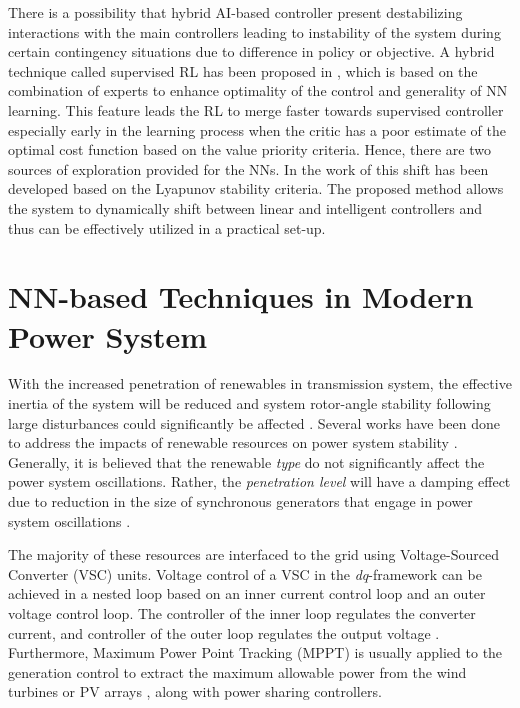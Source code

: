 \documentclass[journal]{IEEEtran}
\begin{document}
There is a possibility that hybrid AI-based controller present destabilizing interactions with the main controllers leading to instability of the system during certain contingency situations due to difference in policy or objective. A hybrid technique called supervised RL has been proposed in \cite{Rosenstein}, which is based on the combination of experts to enhance optimality of the control and generality of NN learning. This feature leads the RL to merge faster towards supervised controller especially early in the learning process when the critic has a poor estimate of the optimal cost function based on the value priority criteria. Hence, there are two sources of exploration provided for the NNs. In the work of \cite{7285605} this shift has been developed based on the Lyapunov stability criteria. The proposed method allows the system to dynamically shift between linear and intelligent controllers and thus can be effectively utilized in a practical set-up. 


\section{NN-based Techniques in Modern Power System}
With the increased penetration of renewables in transmission system, the effective inertia of the system will be reduced and system rotor-angle stability following large disturbances could significantly be affected \cite{4912364}. Several works have been done to address the impacts of renewable resources on power system stability \cite{4912364, 6331592,1525126, 1600554,ETEPETEP598, shah2010impact, shah2013oscillatory, slootweg2003impact,vittal2012rotor, sun2005transient}. Generally, it is believed that the renewable \textit{type} do not significantly affect the power system oscillations. Rather, the \textit{penetration level} will have a damping effect due to reduction in the size of synchronous generators that engage in power system oscillations \cite{slootweg2003impact}. 

The majority of these resources are interfaced to the grid using Voltage-Sourced Converter (VSC) units. Voltage control of a VSC in the \textit{dq}-framework can be achieved in a nested loop based on an inner current control loop and an outer voltage control loop. The controller of the inner loop regulates the converter current, and controller of the outer loop regulates the output voltage \cite{6915705,6200347, 5663773}. Furthermore, Maximum Power Point Tracking (MPPT) is usually applied to the generation control to extract the maximum allowable power from the wind turbines or PV arrays \cite{esram2007comparison}, along with power sharing controllers.
\end{document}
